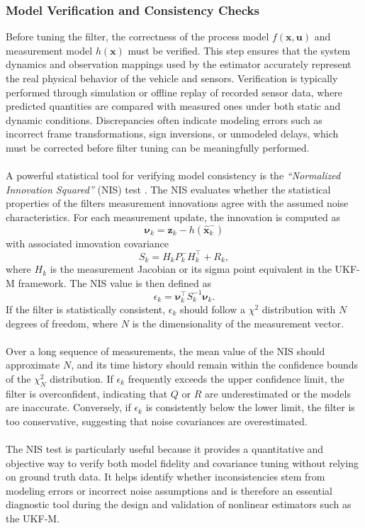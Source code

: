 \subsubsection{Model Verification and Consistency Checks}
Before tuning the filter, the correctness of the process model $f(\mathbf{x}, \mathbf{u})$ and measurement model $h(\mathbf{x})$ must be verified. This step ensures that the system dynamics and observation mappings used by the estimator accurately represent the real physical behavior of the vehicle and sensors. Verification is typically performed through simulation or offline replay of recorded sensor data, where predicted quantities are compared with measured ones under both static and dynamic conditions. Discrepancies often indicate modeling errors such as incorrect frame transformations, sign inversions, or unmodeled delays, which must be corrected before filter tuning can be meaningfully performed.  
\\ \\
A powerful statistical tool for verifying model consistency is the \textit{``Normalized Innovation Squared''} (NIS) test \cite{sensor_fusion_book}. The NIS evaluates whether the statistical properties of the filters measurement innovations agree with the assumed noise characteristics. For each measurement update, the innovation is computed as
$$
    \boldsymbol{\nu}_k = \mathbf{z}_k - h(\hat{\mathbf{x}}_k^-)
$$
with associated innovation covariance
$$
    S_k = H_k P_k^- H_k^\top + R_k,
$$
where $H_k$ is the measurement Jacobian or its sigma point equivalent in the UKF-M framework. The NIS value is then defined as
$$
    \epsilon_k = \boldsymbol{\nu}_k^\top S_k^{-1} \boldsymbol{\nu}_k.
$$
If the filter is statistically consistent, $\epsilon_k$ should follow a $\chi^2$ distribution with $N$ degrees of freedom, where $N$ is the dimensionality of the measurement vector.  
\\ \\
Over a long sequence of measurements, the mean value of the NIS should approximate $N$, and its time history should remain within the confidence bounds of the $\chi^2_N$ distribution. If $\epsilon_k$ frequently exceeds the upper confidence limit, the filter is overconfident, indicating that $Q$ or $R$ are underestimated or the models are inaccurate. Conversely, if $\epsilon_k$ is consistently below the lower limit, the filter is too conservative, suggesting that noise covariances are overestimated.  
\\ \\
The NIS test is particularly useful because it provides a quantitative and objective way to verify both model fidelity and covariance tuning without relying on ground truth data. It helps identify whether inconsistencies stem from modeling errors or incorrect noise assumptions and is therefore an essential diagnostic tool during the design and validation of nonlinear estimators such as the UKF-M.
 


